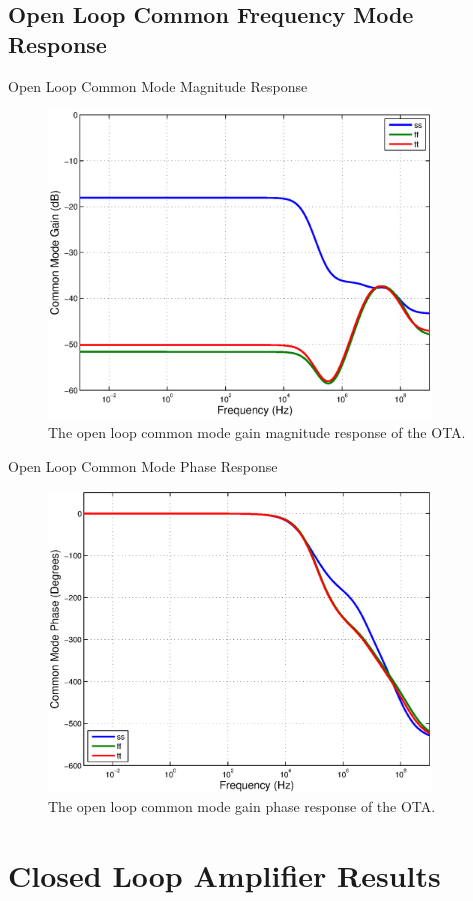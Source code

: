 \documentclass[journal]{IEEEtran}
\begin{document}
\subsection{Open Loop Common Frequency Mode Response}

Open Loop Common Mode Magnitude Response
\begin{figure}
\centering
\includegraphics[width=4in]{Plots/open_cm_gain.eps}
\caption{The open loop common mode gain magnitude response of the OTA.}
\label{fig:open_cm_gain}
\end{figure}

Open Loop Common Mode Phase Response
\begin{figure}
\centering
\includegraphics[width=4in]{Plots/open_cm_phase.eps}
\caption{The open loop common mode gain phase response of the OTA.}
\label{fig:open_cm_phase}
\end{figure}

\section{Closed Loop Amplifier Results}
\end{document}
